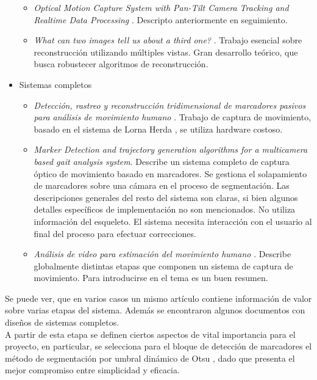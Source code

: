 \begin{itemize}
\begin{itemize}
		\item \emph{Optical Motion Capture System with Pan-Tilt Camera Tracking and  Realtime Data Processing} \cite{kurihara2002optical}.	Descripto anteriormente en seguimiento.	 
		\item \emph{What can two images tell us about a third one?} \cite{faugueras}. Trabajo esencial sobre reconstrucción utilizando múltiples vistas. Gran desarrollo teórico, que busca robustecer algoritmos de reconstrucción.
	\end{itemize}
	\item Sistemas completos
	\begin{itemize}
		\item \emph{Detección, rastreo y reconstrucción tridimensional de marcadores pasivos para análisis de movimiento humano} \cite{colombianos}.	Trabajo de captura de movimiento, basado en el sistema de Lorna Herda \cite{herda}, se utiliza hardware costoso.
		\item \emph{Marker Detection and trajectory generation algorithms for a multicamera based gait analysis system}\cite{shafiq2001marker}.
		Describe un sistema completo de captura óptico de movimiento basado en marcadores.
		Se gestiona el solapamiento de marcadores sobre una cámara en el proceso de segmentación. Las descripciones generales del resto del sistema son claras, si bien algunos detalles específicos de implementación no son mencionados.
		No utiliza información del esqueleto. El sistema necesita interacción con el usuario al final del proceso para efectuar correcciones. 
		\item \emph{Análisis de video para estimación del movimiento humano} \cite{martinez2009analisis}. Describe globalmente distintas etapas que componen un sistema de captura de movimiento. Para introducirse en el tema es un buen resumen.
	\end{itemize}
\end{itemize}

Se puede ver, que en varios casos un mismo artículo contiene información de valor sobre varias etapas del sistema. Además se encontraron algunos documentos con diseños de sistemas completos.
\\ 

A partir de esta etapa se definen ciertos aspectos de vital importancia para el proyecto, en particular, se selecciona para el bloque de detección de marcadores el método de segmentación por umbral dinámico de Otsu \cite{otsu}, dado que presenta el mejor compromiso entre simplicidad y eficacia.
\\ 

